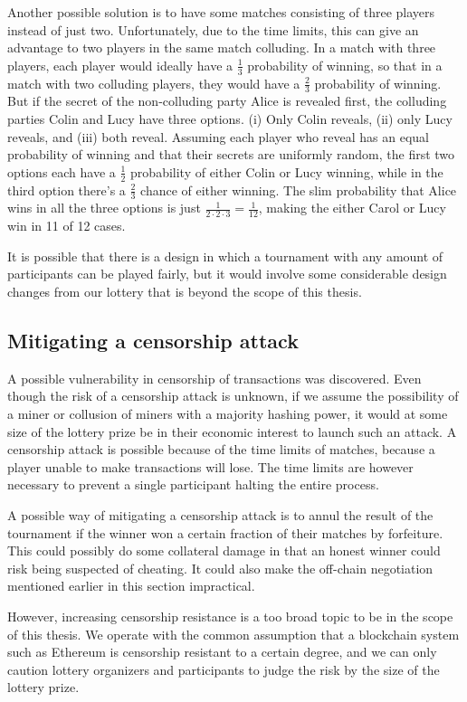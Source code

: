 Another possible solution is to have some matches consisting of three players instead of just two. Unfortunately, due to the time limits, this can give an advantage to two players in the same match colluding. In a match with three players, each player would ideally have a $\frac{1}{3}$ probability of winning, so that in a match with two colluding players, they would have a $\frac{2}{3}$ probability of winning. But if the secret of the non-colluding party Alice is revealed first, the colluding parties Colin and Lucy have three options. (i) Only Colin reveals, (ii) only Lucy reveals, and (iii) both reveal. Assuming each player who reveal has an equal probability of winning and that their secrets are uniformly random, the first two options each have a $\frac{1}{2}$ probability of either Colin or Lucy winning, while in the third option there's a $\frac{2}{3}$ chance of either winning. The slim probability that Alice wins in all the three options is just $\frac{1}{2 \cdot 2 \cdot 3}=\frac{1}{12}$, making the either Carol or Lucy win in 11 of 12 cases.

It is possible that there is a design in which a tournament with any amount of participants can be played fairly, but it would involve some considerable design changes from our lottery that is beyond the scope of this thesis.

\subsection{Mitigating a censorship attack}

A possible vulnerability in censorship of transactions was discovered. Even though the risk of a censorship attack is unknown, if we assume the possibility of a miner or collusion of miners with a majority hashing power, it would at some size of the lottery prize be in their economic interest to launch such an attack. A censorship attack is possible because of the time limits of matches, because a player unable to make transactions will lose. The time limits are however necessary to prevent a single participant halting the entire process. 

A possible way of mitigating a censorship attack is to annul the result of the tournament if the winner won a certain fraction of their matches by forfeiture. This could possibly do some collateral damage in that an honest winner could risk being suspected of cheating. It could also make the off-chain negotiation mentioned earlier in this section impractical. 

However, increasing censorship resistance is a too broad topic to be in the scope of this thesis. We operate with the common assumption that a blockchain system such as Ethereum is censorship resistant to a certain degree, and we can only caution lottery organizers and participants to judge the risk by the size of the lottery prize.
